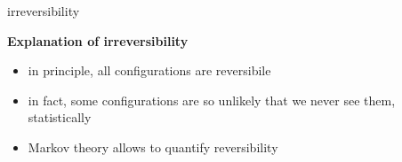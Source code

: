  \begin{frame}{irreversibility}
    \begin{center}
      \Large \textbf{Explanation of irreversibility}
    \end{center}
    \begin{itemize}
      \item \alert{in principle}, all configurations are reversibile
      \item \alert{in fact}, some configurations are so unlikely that we never see them, statistically
      \item Markov theory allows to quantify reversibility
    \end{itemize}
  \end{frame}
